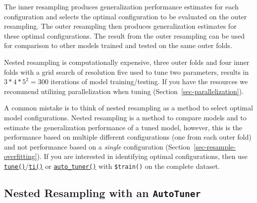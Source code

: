 The inner resampling produces generalization performance estimates for
each configuration and selects the optimal configuration to be evaluated
on the outer resampling. The outer resampling then produces
generalization estimates for these optimal configurations. The result
from the outer resampling can be used for comparison to other models
trained and tested on the same outer folds.

\begin{tcolorbox}[enhanced jigsaw, opacitybacktitle=0.6, rightrule=.15mm, opacityback=0, arc=.35mm, breakable, titlerule=0mm, colframe=quarto-callout-tip-color-frame, coltitle=black, bottomrule=.15mm, toprule=.15mm, colback=white, colbacktitle=quarto-callout-tip-color!10!white, bottomtitle=1mm, toptitle=1mm, title=\textcolor{quarto-callout-tip-color}{\faLightbulb}\hspace{0.5em}{Nested Resampling and Parallelization}, leftrule=.75mm, left=2mm]

Nested resampling is computationally expensive, three outer folds and
four inner folds with a grid search of resolution five used to tune two
parameters, results in \(3*4*5^2 = 300\) iterations of model
training/testing. If you have the resources we recommend utilizing
parallelization when tuning (Section~\ref{sec-parallelization}).

\end{tcolorbox}

A common mistake is to think of nested resampling as a method to select
optimal model configurations. Nested resampling is a method to compare
models and to estimate the generalization performance of a tuned model,
however, this is the performance based on multiple different
configurations (one from each outer fold) and not performance based on a
\emph{single} configuration (Section~\ref{sec-resample-overfitting}). If
you are interested in identifying optimal configurations, then use
\href{https://mlr3tuning.mlr-org.com/reference/tune.html}{\texttt{tune()}}/\href{https://mlr3tuning.mlr-org.com/reference/ti.html}{\texttt{ti()}}
or
\href{https://mlr3tuning.mlr-org.com/reference/auto_tuner.html}{\texttt{auto\_tuner()}}
with \texttt{\$train()} on the complete dataset.

\hypertarget{nested-resampling-with-an-autotuner}{%
\subsection{\texorpdfstring{Nested Resampling with an
\texttt{AutoTuner}}{Nested Resampling with an AutoTuner}}\label{nested-resampling-with-an-autotuner}}

